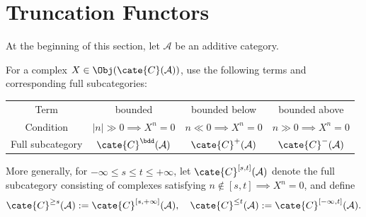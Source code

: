 
\section{Truncation Functors}\label{sec:truncation-functors}
\hypertarget{o014.aljabr2.chapter3.truncation-functors}{ }

At the beginning of this section, let $\mathcal{A}$ be an additive category.

\begin{definition}\label{def:cplx-cat-variant}
	For a complex $X \in \Obj(\cate{C}(\mathcal{A}))$, use the following
	terms and corresponding full subcategories:
	\begin{center}\small\setlength{\tabcolsep}{3pt}\begin{tabular}{|c|c|c|c|}\hline
		Term & bounded & bounded below & bounded above \\
		Condition & $|n| \gg 0 \implies X^n = 0 $ & $n \ll 0 \implies X^n = 0$ & $n \gg 0 \implies X^n = 0$ \\
		Full subcategory & $\cate{C}^{\bdd}(\mathcal{A})$ & $\cate{C}^+(\mathcal{A})$ & $\cate{C}^-(\mathcal{A})$ \\ \hline
	\end{tabular}\end{center}

	More generally, for $-\infty \leq s \leq t \leq +\infty$, let
	$\cate{C}^{[s,t]}(\mathcal{A})$ denote the full subcategory consisting of
	complexes satisfying $n \notin [s, t] \implies X^n = 0$, and define
	\[ \cate{C}^{\geq s}(\mathcal{A}) := \cate{C}^{[s, +\infty]}(\mathcal{A}), \quad \cate{C}^{\leq t}(\mathcal{A}) := \cate{C}^{[-\infty, t]}(\mathcal{A}). \]
\end{definition}

